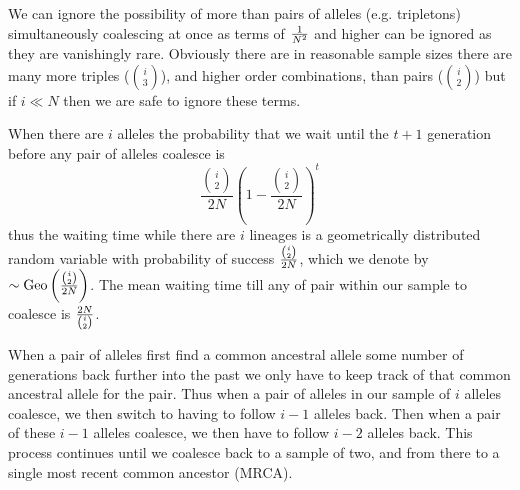 We can ignore the possibility of more than pairs of alleles (e.g. tripletons)
simultaneously coalescing at once as terms of $\nicefrac{1}{N^2}$ and higher
can be ignored as they are vanishingly rare. Obviously there are in reasonable
sample sizes there are many more triples (${i \choose 3}$), and higher order
combinations, than pairs (${i \choose 2}$) but if $i \ll N$ then we are safe to
ignore these terms.


When there are $i$ alleles the probability that we wait until the
$t+1$ generation before
any pair of alleles coalesce is
\begin{equation}
 \frac{{i \choose
 2}}{2N}\left( 1- \frac{{i \choose
 2}}{2N}\right)^{t} \label{eqn:T_i}
\end{equation}
thus the waiting time while there are $i$ lineages is a geometrically
distributed random variable with probability of success $ \nicefrac{{i \choose
 2}}{2N}$, which we denote by $\sim \text{Geo}
\left(  \nicefrac{{i \choose
 2}}{2N} \right)$.
The mean waiting time till any of pair within our
 sample to coalesce is $\nicefrac{2N}{{i \choose
 2}}$.


When a pair of alleles first find a common ancestral allele some
number of generations back further into the past we only have to keep
track of that common ancestral allele for the pair. Thus when a pair
of alleles in our sample of $i$ alleles coalesce, we then switch to
having to follow $i-1$ alleles back. Then when a pair of these $i-1$
alleles coalesce, we then have to follow $i-2$ alleles back. This
process continues until we coalesce back to a sample of two, and from
there to a single most recent common ancestor (MRCA).\\


